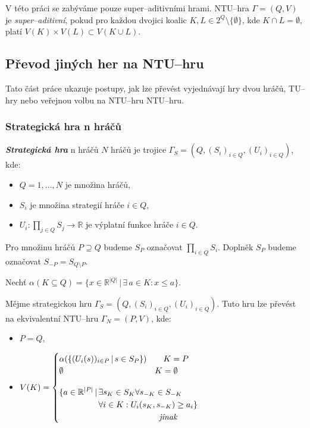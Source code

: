         V této práci se zabýváme pouze super--aditivními hrami. NTU--hra $\Gamma = (Q, V)$ je \textit{super--aditivní}, pokud pro každou dvojici koalic $K, L \in 2^Q \setminus \{\emptyset\}$, kde $K \cap L = \emptyset$, platí $V(K) \times V(L) \subset V(K \cup L)$.

    \subsection{Převod jiných her na NTU--hru}
        Tato část práce ukazuje postupy, jak lze převést vyjednávají hry dvou hráčů, TU--hry nebo veřejnou volbu na NTU--hru NTU--hru.

        \subsubsection*{Strategická hra n hráčů}
            \textit{\textbf{Strategická hra}} n hráčů \cite{Hruby2022NCOOP} $N$ hráčů je trojice $\Gamma_S = (Q, (S_i)_{i\in Q}, (U_i)_{i\in Q})$, kde:
            \begin{itemize}
                \item $Q = {1, \dots, N}$ je množina hráčů,
                \item $S_i$ je množina strategií hráče $i \in Q$,
                \item $U_i: \prod_{j\in Q}S_j \rightarrow \mathbb{R}$ je výplatní funkce hráče $i \in Q$.
            \end{itemize}

            Pro množinu hráčů $P \supseteq Q$ budeme $S_P$ označovat $\prod_{i \in Q}S_i$. Doplněk $S_P$ budeme označovat $S_{-P} = S_{Q\setminus P}$.

            Nechť $\alpha(K \subseteq Q) = \{x \in \mathbb{R}^{|Q|}\,|\, \exists\, a \in K:  x \leqslant a\}$.

            Mějme strategickou hru $\Gamma_S = (Q, (S_i)_{i\in Q}, (U_i)_{i\in Q})$. Tuto hru lze převést na ekvivalentní NTU--hru $\Gamma_N = (P, V)$, kde:
            \begin{itemize}
                \item $P = Q$,
                \item $V(K) = \begin{cases}
                    \alpha(\{(U_i(s))_{i\in P}\,|\,s \in S_P\}) \hspace*{2em} K = P\\
                    \emptyset \hspace*{11em} K = \emptyset \\[1.2em]
                    \begin{aligned}
                        \{a \in \mathbb{R}^{|P|}\,|\,&\exists s_K \in S_K \forall s_{-K} \in S_{-K}\\
                        &\forall i \in K: U_i(s_K, s_{-K}) \geq a_i\}\\
                        &\hspace*{7.3em}\textit{jinak}
                    \end{aligned}
                \end{cases}$
            \end{itemize}

